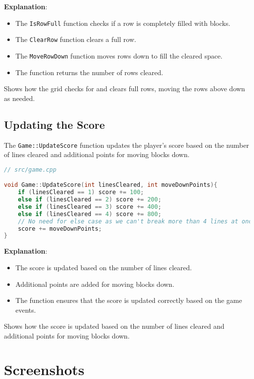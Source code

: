 \documentclass{article}
\begin{document}
\textbf{Explanation}:

\begin{itemize}
    \item The \texttt{IsRowFull} function checks if a row is completely filled with blocks.
    \item The \texttt{ClearRow} function clears a full row.
    \item The \texttt{MoveRowDown} function moves rows down to fill the cleared space.
    \item The function returns the number of rows cleared.
\end{itemize}

Shows how the grid checks for and clears full rows, moving the rows above down as needed.

\subsection{Updating the Score}

The \texttt{Game::UpdateScore} function updates the player's score based on the number of lines cleared and additional points for moving blocks down.

\begin{lstlisting}[language=C++]
// src/game.cpp

void Game::UpdateScore(int linesCleared, int moveDownPoints){
    if (linesCleared == 1) score += 100;
    else if (linesCleared == 2) score += 200;
    else if (linesCleared == 3) score += 400;
    else if (linesCleared == 4) score += 800;
    // No need for else case as we can't break more than 4 lines at once
    score += moveDownPoints;
}
\end{lstlisting}

\textbf{Explanation}:

\begin{itemize}
    \item The score is updated based on the number of lines cleared.
    \item Additional points are added for moving blocks down.
    \item The function ensures that the score is updated correctly based on the game events.
\end{itemize}

Shows how the score is updated based on the number of lines cleared and additional points for moving blocks down.
\section{Screenshots}
\end{document}
